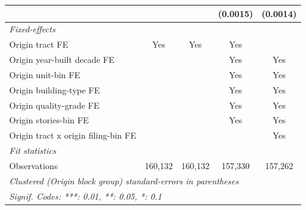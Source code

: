 \begin{tabular}{lcccc}
                                                  &                &                & (0.0015)        & (0.0014)\\   
   \midrule
   \emph{Fixed-effects}\\
   Origin tract FE                                & Yes            & Yes            & Yes             & \\  
   Origin year-built decade FE                    &                &                & Yes             & Yes\\  
   Origin unit-bin FE                             &                &                & Yes             & Yes\\  
   Origin building-type FE                        &                &                & Yes             & Yes\\  
   Origin quality-grade FE                        &                &                & Yes             & Yes\\  
   Origin stories-bin FE                          &                &                & Yes             & Yes\\  
   Origin tract x origin filing-bin FE            &                &                &                 & Yes\\  
   \midrule
   \emph{Fit statistics}\\
   Observations                                   & 160,132        & 160,132        & 157,330         & 157,262\\  
   \midrule \midrule
   \multicolumn{5}{l}{\emph{Clustered (Origin block group) standard-errors in parentheses}}\\
   \multicolumn{5}{l}{\emph{Signif. Codes: ***: 0.01, **: 0.05, *: 0.1}}\\
\end{tabular}
\par\endgroup
